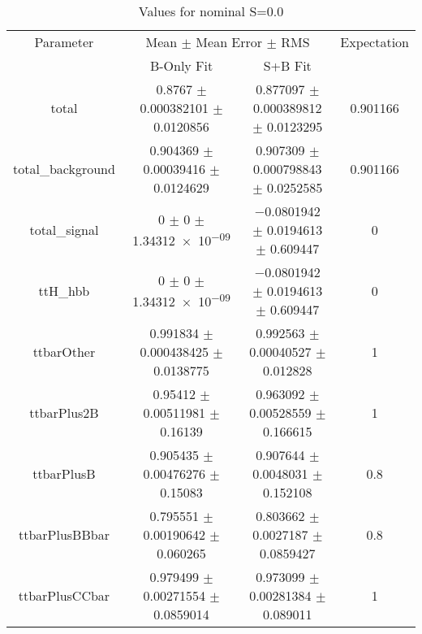 \begin{table}
\centering
\caption{Values for nominal S=0.0}
\begin{tabular}{cccc}
\toprule
Parameter & \multicolumn{2}{c}{Mean $\pm$ Mean Error $\pm$ RMS} & Expectation\\
 & B-Only Fit & S+B Fit & \\
\midrule
total & \num{0.8767} $\pm$ \num{0.000382101} $\pm$ \num{0.0120856} & \num{0.877097} $\pm$ \num{0.000389812} $\pm$ \num{0.0123295} & \num{0.901166}\\
total\_background & \num{0.904369} $\pm$ \num{0.00039416} $\pm$ \num{0.0124629} & \num{0.907309} $\pm$ \num{0.000798843} $\pm$ \num{0.0252585} & \num{0.901166}\\
total\_signal & \num{0} $\pm$ \num{0} $\pm$ \num{1.34312e-09} & \num{-0.0801942} $\pm$ \num{0.0194613} $\pm$ \num{0.609447} & \num{0}\\
ttH\_hbb & \num{0} $\pm$ \num{0} $\pm$ \num{1.34312e-09} & \num{-0.0801942} $\pm$ \num{0.0194613} $\pm$ \num{0.609447} & \num{0}\\
ttbarOther & \num{0.991834} $\pm$ \num{0.000438425} $\pm$ \num{0.0138775} & \num{0.992563} $\pm$ \num{0.00040527} $\pm$ \num{0.012828} & \num{1}\\
ttbarPlus2B & \num{0.95412} $\pm$ \num{0.00511981} $\pm$ \num{0.16139} & \num{0.963092} $\pm$ \num{0.00528559} $\pm$ \num{0.166615} & \num{1}\\
ttbarPlusB & \num{0.905435} $\pm$ \num{0.00476276} $\pm$ \num{0.15083} & \num{0.907644} $\pm$ \num{0.0048031} $\pm$ \num{0.152108} & \num{0.8}\\
ttbarPlusBBbar & \num{0.795551} $\pm$ \num{0.00190642} $\pm$ \num{0.060265} & \num{0.803662} $\pm$ \num{0.0027187} $\pm$ \num{0.0859427} & \num{0.8}\\
ttbarPlusCCbar & \num{0.979499} $\pm$ \num{0.00271554} $\pm$ \num{0.0859014} & \num{0.973099} $\pm$ \num{0.00281384} $\pm$ \num{0.089011} & \num{1}\\
\bottomrule
\end{tabular}
\end{table}